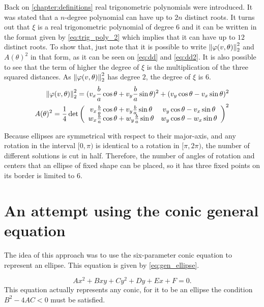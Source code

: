 Back on \autoref{chapter:definitions} real trigonometric polynomials were introduced. It was stated that a $n$-degree polynomial can have up to $2n$ distinct roots. It turns out that $\xi$ is a real trigonometric polynomial of degree $6$ and it can be written in the format given by \autoref{eq:trig_poly_2} which implies that it can have up to $12$ distinct roots.
 To show that, just note that it is possible to write $\left\lVert\varphi(v, \theta)\right\rVert_{2}^2$ and $A(\theta)^2$ in that form, as it can be seen on \autoref{eq:dd} and \autoref{eq:dd2}. It is also possible to see that the term of higher the degree of $\xi$ is the multiplication of the three squared distances. As $\left\lVert\varphi(v, \theta)\right\rVert_{2}^2$ has degree $2$, the degree of $\xi$ is $6$.
\begin{align}\label{eq:dd}
	\left\lVert\varphi(v, \theta)\right\rVert_{2}^2 = (v_x\frac{b}{a}\cos\theta + v_y\frac{b}{a}\sin\theta)^2 + (v_y\cos\theta - v_x\sin\theta)^2\\
	\label{eq:dd2} A(\theta)^2=\dfrac{1}{4}\det\left(
	\begin{array}{cc}
		v_x\frac{b}{a}\cos\theta + v_y\frac{b}{a}\sin\theta&v_y\cos\theta - v_x\sin\theta\\
		w_x\frac{b}{a}\cos\theta + w_y\frac{b}{a}\sin\theta&w_y\cos\theta - w_x\sin\theta
	\end{array}\right)^2
\end{align}

Because ellipses are symmetrical with respect to their major-axis, and any rotation in the interval $[0, \pi)$ is identical to a rotation in $[\pi, 2\pi)$, the number of different solutions is cut in half.
Therefore, the number of angles of rotation and centers that an ellipse of fixed shape can be placed, so it has three fixed points on its border is limited to $6$.

\section{An attempt using the conic general equation}

The idea of this approach was to use the six-parameter conic equation to represent an ellipse. This equation is given by \autoref{eq:gen_ellipse}.

\begin{equation}\label{eq:gen_ellipse}
Ax^2+Bxy+Cy^2+Dy+Ex+F=0.
\end{equation}
This equation actually represents any conic, for it to be an ellipse the condition $B^2 -4AC < 0$ must be satisfied.

